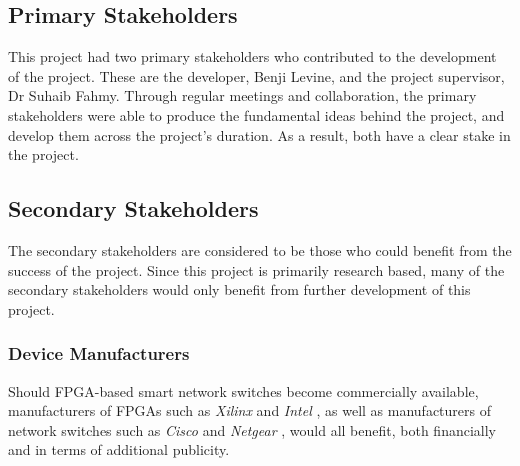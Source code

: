 
\subsection{Primary Stakeholders}
\label{primary_stakeholders}
This project had two primary stakeholders who contributed to the development of the project. These are the developer, Benji Levine, and the project supervisor, Dr Suhaib Fahmy. Through regular meetings and collaboration, the primary stakeholders were able to produce the fundamental ideas behind the project, and develop them across the project's duration. As a result, both have a clear stake in the project.

\subsection{Secondary Stakeholders}
\label{secondary_stakeholders}
The secondary stakeholders are considered to be those who could benefit from the success of the project. Since this project is primarily research based, many of the secondary stakeholders would only benefit from further development of this project.

\subsubsection{Device Manufacturers}
Should FPGA-based smart network switches become commercially available, manufacturers of FPGAs such as \textit{Xilinx} \cite{xilinx} and \textit{Intel} \cite{intel_fpga}, as well as manufacturers of network switches such as \textit{Cisco} \cite{cisco} and \textit{Netgear} \cite{netgear}, would all benefit, both financially and in terms of additional publicity.

